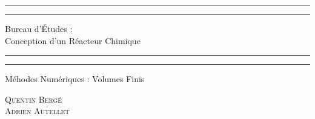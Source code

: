 \documentclass[a4paper,oneside]{article}
\begin{document}


\begin{titlepage} %

	\centering %

	\scshape %

	\vspace*{\baselineskip} %


	\rule{\textwidth}{1.6pt}\vspace*{-\baselineskip}\vspace*{2pt}
	\rule{\textwidth}{0.4pt} %

	\vspace{0.75\baselineskip} %

	{\LARGE Bureau d'\'Etudes :\\
	\vspace{0.75\baselineskip}
	Conception d'un Réacteur Chimique\\
	} %

	\vspace{1\baselineskip} %
	\rule{\textwidth}{0.4pt}\vspace*{-\baselineskip}\vspace*{3.2pt}
	\rule{\textwidth}{1.6pt} %
	\vspace{2\baselineskip} %


	Méhodes Numériques : Volumes Finis

	\vspace*{3\baselineskip} %



	\vspace{0.5\baselineskip} %

	{\scshape\Large Quentin Bergé \\ Adrien Autellet\\} %


\end{titlepage}
\end{document}

